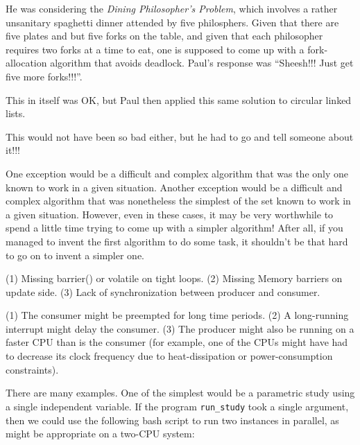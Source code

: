 	He was considering the \emph{Dining Philosopher's Problem}, which
	involves a rather unsanitary spaghetti dinner attended by
	five philosphers.
	Given that there are five plates and but five forks on the table, and
	given that each philosopher requires two forks at a time to eat,
	one is supposed to come up with a fork-allocation algorithm that
	avoids deadlock.
	Paul's response was ``Sheesh!!!  Just get five more forks!!!''.

	This in itself was OK, but Paul then applied this same solution to
	circular linked lists.

	This would not have been so bad either, but he had to go and tell
	someone about it!!!


	One exception would be a difficult and complex algorithm that
	was the only one known to work in a given situation.
	Another exception would be a difficult and complex algorithm
	that was nonetheless the simplest of the set known to work in
	a given situation.
	However, even in these cases, it may be very worthwhile to spend
	a little time trying to come up with a simpler algorithm!
	After all, if you managed to invent the first algorithm
	to do some task, it shouldn't be that hard to go on to
	invent a simpler one.


(1)	Missing barrier() or volatile on tight loops.
(2)	Missing Memory barriers on update side.
(3)	Lack of synchronization between producer and consumer.


(1)	The consumer might be preempted for long time periods.
(2)	A long-running interrupt might delay the consumer.
(3)	The producer might also be running on a faster CPU than is the
	consumer (for example, one of the CPUs might have had to decrease its
	clock frequency due to heat-dissipation or power-consumption
	constraints).


	   There are many examples.
	   One of the simplest would be a parametric study using a
	   single independent variable.
	   If the program {\tt run\_study} took a single argument,
	   then we could use the following bash script to run two
	   instances in parallel, as might be appropriate on a
	   two-CPU system:

